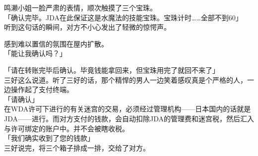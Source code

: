 鸣濑小姐一脸严肃的表情，顺次触摸了三个宝珠。\\

「确认完毕。JDA在此保证这是水魔法的技能宝珠。宝珠计时……全部不到60」\\

听到这句话的瞬间，对方不小心发出了轻微的惊愕声。

感到难以置信的氛围在屋内扩散。\\

「能让我确认吗？」

「请在转账完毕后确认。毕竟钱能拿回来，但宝珠用完了就回不来了」\\

三好这么说道。听了三好的话，那个精悍的男人一边笑着感叹真是个严格的人，一边操作起了支付终端。\\

「请确认」\\

在WDA许可下进行的有关迷宫的交易，必须经过管理机构——日本国内的话就是JDA——进行。而对方支付的钱款，会自动扣除JDA的管理费和迷宫税，然后汇入与许可绑定的账户中。并不会被瞎收税。\\

「我们确实收到了您的钱款」\\

三好说完，将三个箱子排成一排，交给了对方。\\

